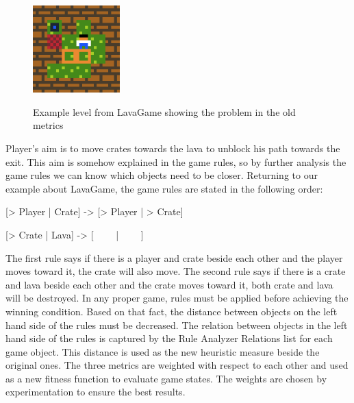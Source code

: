 \documentclass[letterpaper]{article}
\begin{document}
\begin{figure}
  	\centering
    \includegraphics[width=0.3\textwidth]{Images/lavaGame}
    \label{Figure:lavaGame}
    \caption{Example level from LavaGame showing the problem in the old metrics}
\end{figure}

Player's aim is to move crates towards the lava to unblock his path towards the exit. This aim is somehow explained in the game rules, so by further analysis the game rules we can know which objects need to be closer. Returning to our example about LavaGame, the game rules are stated in the following order:
\begin{center}{[> Player | Crate] -> [> Player | > Crate]}\end{center}
\begin{center}{[> Crate | Lava] -> [ \ \ \ \ | \ \ \ \ ]}\end{center}
The first rule says if there is a player and crate beside each other and the player moves toward it, the crate will also move. The second rule says if there is a crate and lava beside each other and the crate moves toward it, both crate and lava will be destroyed. In any proper game, rules must be applied before achieving the winning condition. Based on that fact, the distance between objects on the left hand side of the rules must be decreased. The relation between objects in the left hand side of the rules is captured by the Rule Analyzer Relations list for each game object. This distance is used as the new heuristic measure beside the original ones. The three metrics are weighted with respect to each other and used as a new fitness function to evaluate game states. The weights are chosen by experimentation to ensure the best results.\\\par
\end{document}
